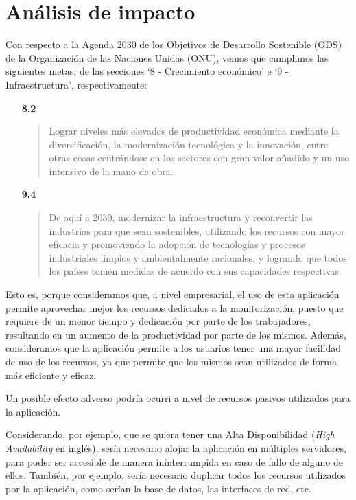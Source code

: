 \chapter{Análisis de impacto}
\label{ch:impacto}

Con respecto a la Agenda 2030 de los Objetivos de Desarrollo Sostenible\cite{desarrollo_sostenible} (ODS) de la Organización de las Naciones Unidas (ONU), vemos que cumplimos las siguientes metas, de las secciones \enquote*{8 - Crecimiento económico}\cite{crecimiento_economico} e \enquote*{9 - Infraestructura}\cite{infraestructura}, respectivamente:
\begin{itemize}
    \item[\textbf{8.2}] 
        \begin{quote}
            Lograr niveles más elevados de productividad económica mediante la diversificación, la modernización tecnológica y la innovación, entre\\ otras cosas centrándose en los sectores con gran valor añadido y un uso intensivo de la mano de obra.
        \end{quote}
    \item[\textbf{9.4}]
        \begin{quote}
            De aquí a 2030, modernizar la infraestructura y reconvertir las industrias para que sean sostenibles, utilizando los recursos con mayor eficacia y promoviendo la adopción de tecnologías y procesos industriales limpios y ambientalmente racionales, y logrando que todos los países tomen medidas de acuerdo con sus capacidades respectivas.
        \end{quote}
\end{itemize}

Esto es, porque consideramos que, a nivel empresarial, el uso de esta aplicación permite aprovechar mejor los recursos dedicados a la monitorización, puesto que requiere de un menor tiempo y dedicación por parte de los trabajadores, resultando en un aumento de la productividad por parte de los mismos. Además, consideramos que la aplicación permite a los usuarios tener una mayor facilidad de uso de los recursos, ya que permite que los mismos sean utilizados de forma más eficiente y eficaz.

Un posible efecto adverso podría ocurri a nivel de recursos pasivos utilizados para la aplicación.

Considerando, por ejemplo, que se quiera tener una Alta Disponibilidad (\textit{High Availability} en inglés), sería necesario alojar la aplicación en múltiples servidores, para poder ser accesible de manera ininterrumpida en caso de fallo de alguno de ellos. También, por ejemplo, sería necesario duplicar todos los recursos utilizados por la aplicación, como serían la base de datos, las interfaces de red, etc. 

